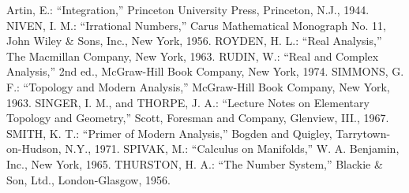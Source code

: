 \begin{thebibliography}{A}
 Artin, E.: ``Integration,'' Princeton University Press, Princeton, N.J., 1944.
 NIVEN, I. M.: ``Irrational Numbers,'' Carus Mathematical Monograph No. 11, John Wiley \& Sons, Inc., New York, 1956.
 ROYDEN, H. L.: ``Real Analysis,'' The Macmillan Company, New York, 1963.
 RUDIN, W.: ``Real and Complex Analysis,'' 2nd ed., McGraw-Hill Book Company, New York, 1974.
 SIMMONS, G. F.: ``Topology and Modern Analysis,'' McGraw-Hill Book Company, New York, 1963.
 SINGER, I. M., and THORPE, J. A.: ``Lecture Notes on Elementary Topology and Geometry,'' Scott, Foresman and Company, Glenview, III., 1967.
 SMITH, K. T.: ``Primer of Modern Analysis,'' Bogden and Quigley, Tarrytown-on-Hudson, N.Y., 1971.
 SPIVAK, M.: ``Calculus on Manifolds,'' W. A. Benjamin, Inc., New York, 1965.
 THURSTON, H. A.: ``The Number System,'' Blackie \& Son, Ltd., London-Glasgow, 1956.

\end{thebibliography}

